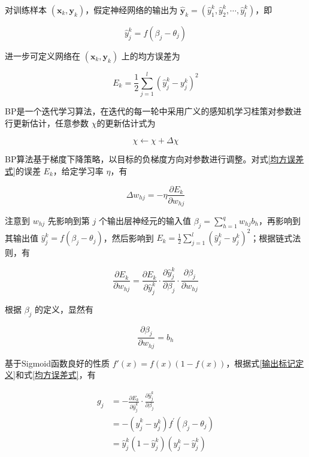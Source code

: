 \documentclass{ctexart}
\begin{document}
	对训练样本 $(\bm{x}_k,\bm{y}_k)$，假定神经网络的输出为 $\hat{\bm{y}}_k=(\hat{y}_1^k,\hat{y}_2^k,\cdots,\hat{y}_l^k)$，即
	
	\begin{equation}
		\hat{y}_j^k=f(\beta_j-\theta_j)
		\label{输出标记定义}
	\end{equation}
	
	进一步可定义网络在 $(\bm{x}_k,\bm{y}_k)$ 上的均方误差为
	
	\begin{equation}
		E_{k}=\frac{1}{2} \sum_{j=1}^{l}\left(\hat{y}_{j}^{k}-y_{j}^{k}\right)^{2}
		\label{均方误差式}
	\end{equation}
	
	BP是一个迭代学习算法，在迭代的每一轮中采用广义的感知机学习桂策对参数进行更新估计，任意参数 $\chi$的更新估计式为
	
	\begin{equation}
		\chi\leftarrow\chi+\Delta\chi
		\label{w增量}
	\end{equation}
	
	BP算法基于梯度下降策略，以目标的负梯度方向对参数进行调整。对式\eqref{均方误差式}的误差 $E_k$，给定学习率 $\eta$，有
	
	\begin{equation}
		\Delta w_{h j}=-\eta \frac{\partial E_{k}}{\partial w_{h j}}
	\end{equation}

	注意到 $w_{hj}$ 先影响到第 $j$ 个输出层神经元的输入值 $\beta_j=\sum\limits_{h=1}^q w_{hj}b_h$，再影响到其输出值 $\hat{y}_j^k=f(\beta_j-\theta_j)$，然后影响到 $E_{k}=\frac{1}{2} \sum\limits_{j=1}^{l}\left(\hat{y}_{j}^{k}-y_{j}^{k}\right)^{2}$；根据链式法则，有
	
	\begin{equation}
		\frac{\partial E_{k}}{\partial w_{h j}}=\frac{\partial E_{k}}{\partial \hat{y}_{j}^{k}} \cdot \frac{\partial \hat{y}_{j}^{k}}{\partial \beta_{j}} \cdot \frac{\partial \beta_{j}}{\partial w_{h j}}
		\label{链式偏导}
	\end{equation}

	根据 $\beta_{j}$ 的定义，显然有
	
	\begin{equation}
		\frac{\partial \beta_{j}}{\partial w_{h j}}=b_{h}
		\label{bh}
	\end{equation}

	基于Sigmoid函数良好的性质 $f'(x)=f(x)(1-f(x))$，根据式\eqref{输出标记定义}和式\eqref{均方误差式}，有
	
	\begin{equation}
		\begin{aligned}
			g_{j} &=-\frac{\partial E_{k}}{\partial \hat{y}_{j}^{k}} \cdot \frac{\partial \hat{y}_{j}^{k}}{\partial \beta_{j}} \\
			&=-\left(\hat{y}_{j}^{k}-y_{j}^{k}\right) f^{\prime}\left(\beta_{j}-\theta_{j}\right) \\
			&=\hat{y}_{j}^{k}\left(1-\hat{y}_{j}^{k}\right)\left(y_{j}^{k}-\hat{y}_{j}^{k}\right)
		\end{aligned}
		\label{gj}
	\end{equation}
\end{document}
